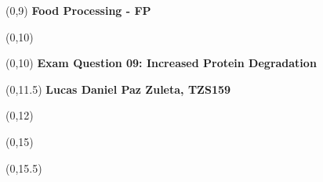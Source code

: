 \begin{titlepage}

    
    \begin{textblock}{9.4}(0,9)
        \Huge{\selectfont\bfseries{Food Processing - FP}}
    \end{textblock}
    \begin{textblock}{9.4}(0,10)
        \Huge{\selectfont\bfseries{}}
    \end{textblock}
    
    \begin{textblock}{9.4}(0,10)
        \LARGE{\selectfont\bfseries{Exam Question 09: Increased Protein Degradation}}
    \end{textblock}
    
    \begin{textblock}{9.4}(0,11.5)
        \large{\selectfont\bfseries{
        Lucas Daniel Paz Zuleta, TZS159}}
    \end{textblock}
    
    \begin{textblock}{9.4}(0,12)
        \large{\selectfont{MSc student at the University of Copenhagen}}
    \end{textblock}
    
    \begin{textblock}{9.4}(0,15)
        \large{\selectfont{Last compiled: \today}}
    \end{textblock}
    
    \begin{textblock}{8.4}(0,15.5)
        \large{}
    \end{textblock}
    

\end{titlepage}

